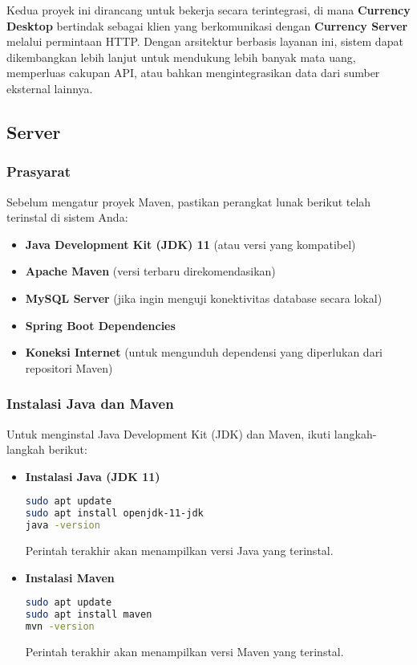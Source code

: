 Kedua proyek ini dirancang untuk bekerja secara terintegrasi, di mana \textbf{Currency Desktop} bertindak sebagai klien yang berkomunikasi dengan \textbf{Currency Server} melalui permintaan HTTP. Dengan arsitektur berbasis layanan ini, sistem dapat dikembangkan lebih lanjut untuk mendukung lebih banyak mata uang, memperluas cakupan API, atau bahkan mengintegrasikan data dari sumber eksternal lainnya.

\subsection{Server}

\subsubsection{Prasyarat}
Sebelum mengatur proyek Maven, pastikan perangkat lunak berikut telah terinstal di sistem Anda:

\begin{itemize}
\item \textbf{Java Development Kit (JDK) 11} (atau versi yang kompatibel)
\item \textbf{Apache Maven} (versi terbaru direkomendasikan)
\item \textbf{MySQL Server} (jika ingin menguji konektivitas database secara lokal)
\item \textbf{Spring Boot Dependencies}
\item \textbf{Koneksi Internet} (untuk mengunduh dependensi yang diperlukan dari repositori Maven)
\end{itemize}

\subsubsection{Instalasi Java dan Maven}
Untuk menginstal Java Development Kit (JDK) dan Maven, ikuti langkah-langkah berikut:

\begin{itemize}
\item \textbf{Instalasi Java (JDK 11)}
\begin{lstlisting}[language=bash]
sudo apt update
sudo apt install openjdk-11-jdk
java -version
\end{lstlisting}
Perintah terakhir akan menampilkan versi Java yang terinstal.

\item \textbf{Instalasi Maven}
\begin{lstlisting}[language=bash]
sudo apt update
sudo apt install maven
mvn -version
\end{lstlisting}
Perintah terakhir akan menampilkan versi Maven yang terinstal.
\end{itemize}

